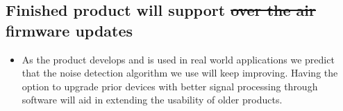 \documentclass[12pt, titlepage]{article}
\begin{document}
\subsection{Finished product will support \sout{over the air} firmware updates}
\begin{itemize}
    \item As the product develops and is used in
    real world applications we predict that the
    noise detection algorithm we use will keep
    improving. Having the option to upgrade
    prior devices with better signal processing
    through software will aid in extending the
    usability of older products.
    
\end{itemize}
\end{document}
